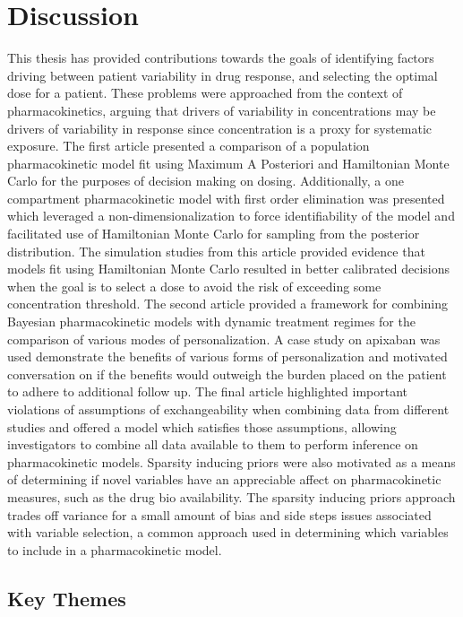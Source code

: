 \chapter{Discussion}

This thesis has provided contributions towards the goals of identifying factors driving between patient variability in drug response, and selecting the optimal dose for a patient.  These problems were approached from the context of pharmacokinetics, arguing that drivers of variability in concentrations may be drivers of variability in response since concentration is a proxy for systematic exposure.  The first article presented a comparison of a population pharmacokinetic model fit using Maximum A Posteriori and Hamiltonian Monte Carlo for the purposes of decision making on dosing.  Additionally, a one compartment pharmacokinetic model with first order elimination was presented which leveraged a non-dimensionalization to force identifiability of the model and facilitated use of Hamiltonian Monte Carlo for sampling from the posterior distribution. The simulation studies from this article provided evidence that models fit using Hamiltonian Monte Carlo resulted in better calibrated decisions when the goal is to select a dose to avoid the risk of exceeding some concentration threshold.  The second article provided a framework for combining Bayesian pharmacokinetic models with dynamic treatment regimes for the comparison of various modes of personalization.  A case study on apixaban was used demonstrate the benefits of various forms of personalization and motivated conversation on if the benefits would outweigh the burden placed on the patient to adhere to additional follow up. The final article highlighted important violations of assumptions of exchangeability when combining data from different studies and offered a model which satisfies those assumptions, allowing investigators to combine all data available to them to perform inference on pharmacokinetic models. Sparsity inducing priors were also motivated as a means of determining if novel variables have an appreciable affect on pharmacokinetic measures, such as the drug bio availability. The sparsity inducing priors approach trades off variance for a small amount of bias and side steps issues associated with variable selection, a common approach used in determining which variables to include in a pharmacokinetic model.

\section{Key Themes}

